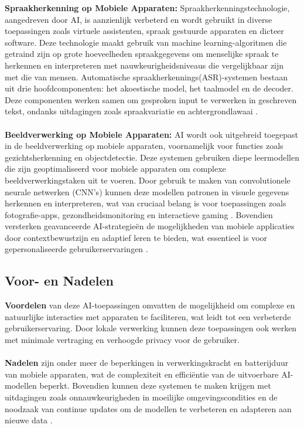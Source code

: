 \textbf{Spraakherkenning op Mobiele Apparaten:}
Spraakherkenningstechnologie, aangedreven door AI, is aanzienlijk verbeterd en wordt gebruikt in diverse toepassingen zoals virtuele assistenten, spraak gestuurde apparaten en dicteer software. De\-ze technologie maakt gebruik van machine learning-algoritmen die getraind zijn op grote hoeveelheden spraakgegevens om menselijke spraak te herkennen en interpreteren met nauwkeurigheidsniveaus die vergelijkbaar zijn met die van mensen. Automatische spraakherkennings(ASR)-systemen bestaan uit drie hoofdcomponenten: het akoestische model, het taalmodel en de decoder. Deze componenten werken samen om gesproken input te verwerken in geschreven tekst, ondanks uitdagingen zoals spraakvariatie en achtergrondlawaai \autocite{Wang2023}.
\\ \\
\textbf{Beeldverwerking op Mobiele Apparaten:}
AI wordt ook uitgebreid toegepast in de beeldverwerking op mobiele apparaten, voornamelijk voor functies zoals gezichtsherkenning en objectdetectie. Deze systemen gebruiken diepe leermodellen die zijn geoptimaliseerd voor mobiele apparaten om complexe beeldverwerkingstaken uit te voeren. Door gebruik te maken van convolutionele neurale netwerken (CNN's) kunnen deze modellen patronen in visuele gegevens herkennen en interpreteren, wat van cruciaal belang is voor toepassingen zoals fotografie-apps, gezondheidsmonitoring en interactieve gaming \autocite{Luo2018}. Bovendien versterken geavanceerde AI-strategieën de mogelijkheden van mobiele applicaties door contextbewustzijn en adaptief leren te bieden, wat essentieel is voor gepersonaliseerde gebruikerservaringen \autocite{Sarker2021}.

\subsection{Voor- en Nadelen}

\textbf{Voordelen} van deze AI-toepassingen omvatten de mogelijkheid om complexe en natuurlijke interacties met apparaten te faciliteren, wat leidt tot een verbeterde gebruikerservaring. Door lokale verwerking kunnen deze toepassingen ook werken met minimale vertraging en verhoogde privacy voor de gebruiker.
\\ \\
\textbf{Nadelen} zijn onder meer de beperkingen in verwerkingskracht en batterijduur van mobiele apparaten, wat de complexiteit en efficiëntie van de uitvoerbare AI-modellen beperkt. Bovendien kunnen deze systemen te maken krijgen met uitdagingen zoals onnauwkeurigheden in moeilijke omgevingscondities en de noodzaak van continue updates om de modellen te verbeteren en adapteren aan nieuwe data \autocite{Castanyer2021}.


